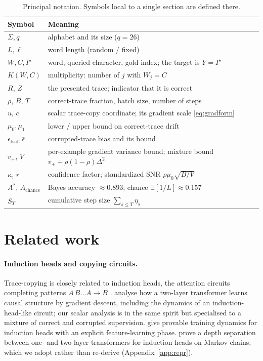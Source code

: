 \documentclass{article}
\theoremstyle{plain}
\theoremstyle{definition}
\theoremstyle{remark}
\newcommand{\E}{\mathbb{E}}
\newcommand{\1}{\mathbf{1}}
\newcommand{\bad}{\mathrm{bad}}
\begin{document}
\begin{table}[t]
\caption{Principal notation. Symbols local to a single section are defined there.}
\label{tab:notation}
\centering
\small
\begin{tabular}{ll}
\toprule
Symbol & Meaning \\
\midrule
$\Sigma, q$ & alphabet and its size ($q = 26$) \\
$L, \ell$ & word length (random / fixed) \\
$W, C, I^\star$ & word, queried character, gold index; the target is $Y = I^\star$ \\
$K(W,C)$ & multiplicity: number of $j$ with $W_j = C$ \\
$R$, $Z$ & the presented trace; indicator that it is correct \\
$\rho$, $B$, $T$ & correct-trace fraction, batch size, number of steps \\
$u$, $c$ & scalar trace-copy coordinate; its gradient scale \eqref{eq:gradform} \\
$\mu_0,\mu_1$ & lower / upper bound on correct-trace drift \\
$\epsilon_\bad,\bar\epsilon$ & corrupted-trace bias and its bound \\
$v_+$, $V$ & per-example gradient variance bound; mixture bound $v_+ +\rho(1-\rho)\Delta^2$ \\
$\kappa$, $r$ & confidence factor; standardized SNR $\rho\mu_0\sqrt{B/V}$ \\
$\bar A^\star$, $A_{\mathrm{chance}}$ & Bayes accuracy $\approx0.893$; chance $\E[1/L]\approx0.157$ \\
$S_T$ & cumulative step size $\sum_{s\le T}\eta_s$ \\
\bottomrule
\end{tabular}
\end{table}

\section{Related work}
\label{sec:related}

\paragraph{Induction heads and copying circuits.}
Trace-copying is closely related to induction heads, the attention circuits
completing patterns $A\,B\ldots A\to B$ \citep{olsson2022incontext}.
\citet{nichani2024how} analyse how a two-layer transformer learns causal
structure by gradient descent, including the dynamics of an induction-head-like
circuit; our scalar analysis is in the same spirit but specialised to a mixture
of correct and corrupted supervision. \citet{chen2024unveiling} give provable
training dynamics for induction heads with an explicit feature-learning phase.
\citet{ekbote2025what} prove a depth separation between one- and two-layer
transformers for induction heads on Markov chains, which we adopt rather than
re-derive (Appendix~\ref{app:repr}).
\end{document}
